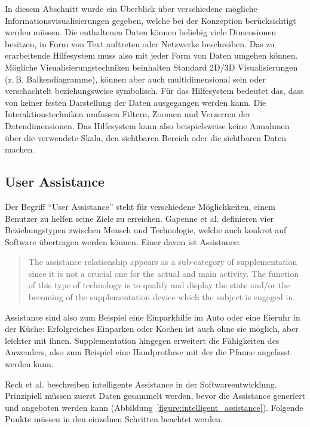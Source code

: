 \documentclass[
	headsepline,
	footsepline,
	fontsize=12pt,
	bibliography=totoc
]{scrbook}
\begin{document}
In diesem Abschnitt wurde ein Überblick über verschiedene mögliche Informationsvisualisierungen gegeben, welche bei der Konzeption berücksichtigt werden müssen. Die enthaltenen Daten können beliebig viele Dimensionen besitzen, in Form von Text auftreten oder Netzwerke beschreiben. Das zu erarbeitende Hilfesystem muss also mit jeder Form von Daten umgehen können. Mögliche Visualisierungstechniken beinhalten Standard 2D/3D Visualisierungen (z.\,B. Balkendiagramme), können aber auch multidimensional sein oder verschachtelt beziehungsweise symbolisch. Für das Hilfesystem bedeutet das, dass von keiner festen Darstellung der Daten ausgegangen werden kann. Die Interaktionstechniken umfassen Filtern, Zoomen und Verzerren der Datendimensionen. Das Hilfesystem kann also beispielsweise keine Annahmen über die verwendete Skala, den sichtbaren Bereich oder die sichtbaren Daten machen.

\subsection{User Assistance}
\label{section:standderforschung:grundlagen:user_assistance}


Der Begriff \enquote{User Assistance} steht für verschiedene Möglichkeiten, einem Benutzer zu helfen seine Ziele zu erreichen. Gapenne et al. \cite{Gapenne2002} definieren vier Beziehungstypen zwischen Mensch und Technologie, welche auch konkret auf Software übertragen werden können. Einer davon ist Assistance:

\begin{quote}
The assistance relationship appears as a sub-category of supplementation since it is not a crucial one for the actual and main activity. The function of this type of technology is to qualify and display the state and/or the becoming of the supplementation device which the subject is engaged in.
\end{quote}

Assistance sind also zum Beispiel eine Einparkhilfe im Auto oder eine Eieruhr in der Küche: Erfolgreiches Einparken oder Kochen ist auch ohne sie möglich, aber leichter mit ihnen. Supplementation hingegen erweitert die Fähigkeiten des Anwenders, also zum Beispiel eine Handprothese mit der die Pfanne angefasst werden kann.


Rech et al. \cite{Rech2007} beschreiben intelligente Assistance in der Softwareentwicklung. Prinzipiell müssen zuerst Daten gesammelt werden, bevor die Assistance generiert und angeboten werden kann (Abbildung~\ref{figure:intelligent_assistance}). Folgende Punkte müssen in den einzelnen Schritten beachtet werden.
\end{document}
